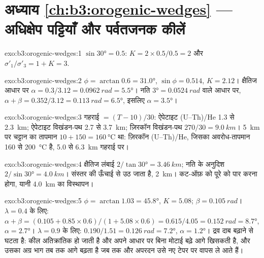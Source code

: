 \section*{अध्याय \ref{ch:b3:orogenic-wedges} --- अधिक्षेप पट्टियाँ और पर्वतजनक कीलें}

\begin{solution}{exo:b3:orogenic-wedges:1}
$\sin\ang{30} = 0.5$: $K = 2\times0.5/0.5 = 2$ और $\sigma'_1/\sigma'_3 = 1 +
K = 3$.
\end{solution}

\begin{solution}{exo:b3:orogenic-wedges:2}
$\phi = \arctan0.6 = \ang{31.0}$, $\sin\phi = 0.514$, $K = 2.12$।
क्षैतिज आधार पर $\alpha = 0.3/3.12 = \qty{0.0962}{rad} = \ang{5.5}$।
नति $\ang{3} = \qty{0.0524}{rad}$ वाले आधार पर, $\alpha + \beta = 0.352/3.12 =
\qty{0.113}{rad} = \ang{6.5}$, इसलिए $\alpha = \ang{3.5}$।
\end{solution}

\begin{solution}{exo:b3:orogenic-wedges:3}
गहराई $= (T - 10)/30$: ऐपेटाइट (U--Th)/He 1.3 से \qty{2.3}{km}; ऐपेटाइट विखंडन-पथ
2.7 से \qty{3.7}{km}; ज़िरकॉन विखंडन-पथ $270/30 = \qty{9.0}{km}$।
\qty{5}{km} पर चट्टान का तापमान $10 + 150 = \qty{160}{\celsius}$ था: ज़िरकॉन
(U--Th)/He, जिसका अवरोध-तापमान 160 से \qty{200}{\celsius} है, 5.0 से
\qty{6.3}{km} गहराई पर।
\end{solution}

\begin{solution}{exo:b3:orogenic-wedges:4}
क्षैतिज लंबाई $2/\tan\ang{30} = \qty{3.46}{km}$; नति के अनुदिश
$2/\sin\ang{30} = \qty{4.0}{km}$। संस्तर  की ऊँचाई से उठ जाता है,
\qty{2}{km}। कट-ऑफ़ को पूरे  को पार करना होगा, यानी
\qty{4.0}{km} का विस्थापन।
\end{solution}

\begin{solution}{exo:b3:orogenic-wedges:5}
$\phi = \arctan1.03 = \ang{45.8}$, $K = 5.08$; $\beta = \qty{0.105}{rad}$।
$\lambda = 0.4$ के लिए: $\alpha + \beta = (0.105 + 0.85\times0.6)/(1 +
5.08\times0.6) = 0.615/4.05 = \qty{0.152}{rad} = \ang{8.7}$, $\alpha =
\ang{2.7}$। $\lambda = 0.9$ के लिए: $0.190/1.51 = \qty{0.126}{rad} = \ang{7.2}$,
$\alpha = \ang{1.2}$। द्रव दाब बढ़ाने से  घटता है:
कील अतिक्रांतिक हो जाती है और अपने आधार पर बिना मोटाई बढ़े आगे खिसकती है,
और उसका अग्र भाग तब तक आगे बढ़ता है जब तक  और अपरदन उसे
नए टेपर पर वापस ले आते हैं।
\end{solution}

